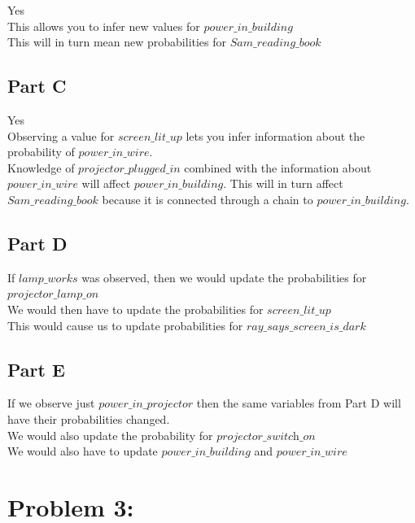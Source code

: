 \documentclass[twoside,11pt]{article}
\theoremstyle{definition}
\begin{document}
Yes\\
This allows you to infer new values for $\textit{power\_in\_building}$\\
This will in turn mean new probabilities for $\textit{Sam\_reading\_book}$\\

\subsection*{Part C}

Yes\\
Observing a value for $\textit{screen\_lit\_up}$ lets you infer information about the probability of $\textit{power\_in\_wire}$. \\
Knowledge of $\textit{projector\_plugged\_in}$ combined with the information about $\textit{power\_in\_wire}$ will affect $\textit{power\_in\_building}$. This will in turn affect  $\textit{Sam\_reading\_book}$ because it is connected through a chain to $\textit{power\_in\_building}$.

\subsection*{Part D}

If $\textit{lamp\_works}$ was observed, then we would update the probabilities for $\textit{projector\_lamp\_on}$\\
We would then have to update the probabilities for $\textit{screen\_lit\_up}$\\
This would cause us to update probabilities for $\textit{ray\_says\_screen\_is\_dark}$\\

\subsection*{Part E}

If we observe just $\textit{power\_in\_projector}$ then the same variables from Part D will have their probabilities changed.\\
We would also update the probability for $\textit{projector\_switch\_on}$\\
We would also have to update $\textit{power\_in\_building}$ and $\textit{power\_in\_wire}$\\


\newpage

\section*{Problem 3: }
\end{document}
